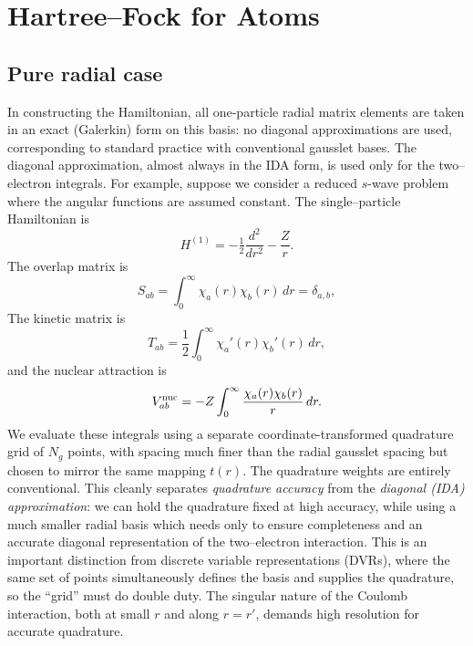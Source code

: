 \documentclass[aps,pra,reprint,longbibliography,nofootinbib]{revtex4-2}
\begin{document}
\section{Hartree--Fock for Atoms}
\subsection{Pure radial case}
In constructing the Hamiltonian, all one-particle radial matrix elements are taken in an exact (Galerkin) form on this basis: no diagonal approximations are used, corresponding to standard practice with conventional gausslet bases. The diagonal approximation, almost always in the IDA form, is used only for the two--electron integrals. For example, suppose we consider a reduced $s$-wave problem where the angular functions are assumed constant.   The single--particle Hamiltonian is
\begin{equation}
H^{(1)} = -\tfrac12 \frac{d^2}{dr^2} - \frac{Z}{r}.
\end{equation}
The overlap matrix is 
\begin{equation}
S_{ab} = \int_0^\infty \chi_a(r)\chi_b(r)\,dr = \delta_{a,b},
\end{equation}
The kinetic matrix is
\begin{equation}
T_{ab} = \frac12\int_0^\infty \chi_a'(r)\chi_b'(r)\,dr,
\end{equation}
and the nuclear attraction is
\begin{equation}
V^{\rm nuc}_{ab} = -Z\int_0^\infty \frac{\chi_a(r)\chi_b(r)}{r}\,dr.
\end{equation}
We evaluate these integrals using a separate coordinate-transformed quadrature grid of $N_g$ points,
with spacing much finer than the radial gausslet spacing but chosen to mirror the same mapping $t(r)$.
The quadrature weights are entirely conventional. This cleanly separates \emph{quadrature accuracy}
from the \emph{diagonal (IDA) approximation}: we can hold the quadrature fixed at high accuracy,
while using a much smaller radial basis which needs only to ensure completeness and an accurate diagonal representation of the two--electron
interaction.  This is an important distinction from discrete variable representations (DVRs), where
the same set of points simultaneously defines the basis and supplies the quadrature, so the ``grid''
must do double duty. The singular nature of the Coulomb interaction, both at small $r$ and along $r=r'$, demands high resolution for accurate quadrature. 
\end{document}
